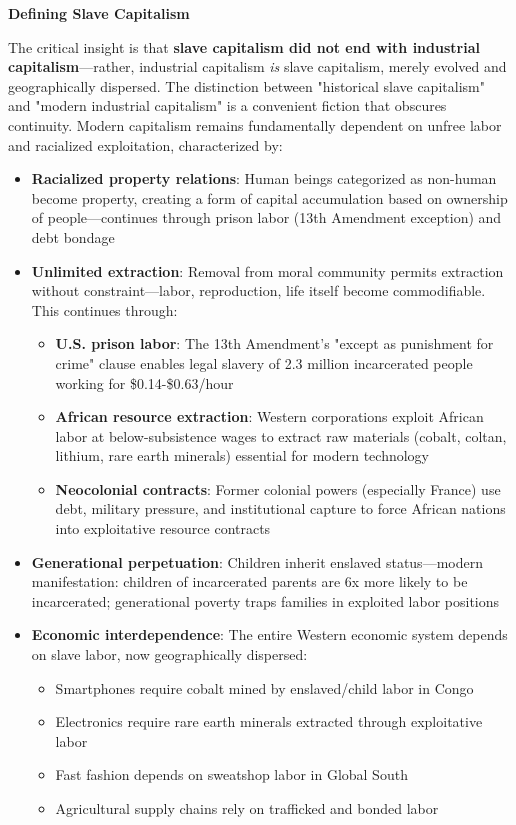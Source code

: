 \documentclass[12pt,openany]{book}
\begin{document}
\textbf{Defining Slave Capitalism}

The critical insight is that \textbf{slave capitalism did not end with industrial capitalism}---rather, industrial capitalism \textit{is} slave capitalism, merely evolved and geographically dispersed. The distinction between "historical slave capitalism" and "modern industrial capitalism" is a convenient fiction that obscures continuity. Modern capitalism remains fundamentally dependent on unfree labor and racialized exploitation, characterized by:

\begin{itemize}
    \item \textbf{Racialized property relations}: Human beings categorized as non-human become property, creating a form of capital accumulation based on ownership of people---continues through prison labor (13th Amendment exception) and debt bondage
    
    \item \textbf{Unlimited extraction}: Removal from moral community permits extraction without constraint---labor, reproduction, life itself become commodifiable. This continues through:
    \begin{itemize}
        \item \textbf{U.S. prison labor}: The 13th Amendment's "except as punishment for crime" clause enables legal slavery of 2.3 million incarcerated people working for \$0.14-\$0.63/hour
        \item \textbf{African resource extraction}: Western corporations exploit African labor at below-subsistence wages to extract raw materials (cobalt, coltan, lithium, rare earth minerals) essential for modern technology \cite{rodney}
        \item \textbf{Neocolonial contracts}: Former colonial powers (especially France) use debt, military pressure, and institutional capture to force African nations into exploitative resource contracts
    \end{itemize}
    
    \item \textbf{Generational perpetuation}: Children inherit enslaved status---modern manifestation: children of incarcerated parents are 6x more likely to be incarcerated; generational poverty traps families in exploited labor positions
    
    \item \textbf{Economic interdependence}: The entire Western economic system depends on slave labor, now geographically dispersed:
    \begin{itemize}
        \item Smartphones require cobalt mined by enslaved/child labor in Congo
        \item Electronics require rare earth minerals extracted through exploitative labor
        \item Fast fashion depends on sweatshop labor in Global South
        \item Agricultural supply chains rely on trafficked and bonded labor
    \end{itemize}
    

\end{itemize}
\end{document}
